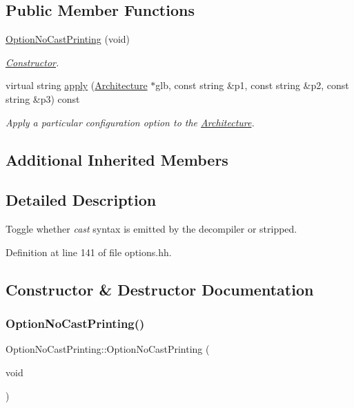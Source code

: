 \subsection*{Public Member Functions}
\begin{DoxyCompactItemize}
\item 
\mbox{\hyperlink{class_option_no_cast_printing_aa0a13e463c266f07558274ace2e57bf1}{Option\+No\+Cast\+Printing}} (void)
\begin{DoxyCompactList}\small\item\em \mbox{\hyperlink{class_constructor}{Constructor}}. \end{DoxyCompactList}\item 
virtual string \mbox{\hyperlink{class_option_no_cast_printing_a75a6992f570f828de4a07eb5a4c73fea}{apply}} (\mbox{\hyperlink{class_architecture}{Architecture}} $\ast$glb, const string \&p1, const string \&p2, const string \&p3) const
\begin{DoxyCompactList}\small\item\em Apply a particular configuration option to the \mbox{\hyperlink{class_architecture}{Architecture}}. \end{DoxyCompactList}\end{DoxyCompactItemize}
\subsection*{Additional Inherited Members}


\subsection{Detailed Description}
Toggle whether {\itshape cast} syntax is emitted by the decompiler or stripped. 

Definition at line 141 of file options.\+hh.



\subsection{Constructor \& Destructor Documentation}
\mbox{\label{class_option_no_cast_printing_aa0a13e463c266f07558274ace2e57bf1}} 
\subsubsection{\texorpdfstring{OptionNoCastPrinting()}{OptionNoCastPrinting()}}
{\footnotesize\ttfamily Option\+No\+Cast\+Printing\+::\+Option\+No\+Cast\+Printing (\begin{DoxyParamCaption}\item[{void}]{ }\end{DoxyParamCaption})\hspace{0.3cm}{\ttfamily [inline]}}



